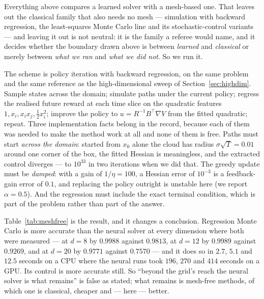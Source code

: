 \documentclass[conference]{IEEEtran}
\begin{document}
Everything above compares a learned solver with a mesh-based one. That leaves out the classical
family that also needs no mesh --- simulation with backward regression, the least-squares Monte Carlo
line \cite{longstaff2001valuing,glaserman2003monte} and its stochastic-control variants
\cite{kharroubi2014numerical,bender2012least} --- and leaving it out is not neutral: it is the family
a referee would name, and it decides whether the boundary drawn above is between \emph{learned} and
\emph{classical} or merely between \emph{what we ran} and \emph{what we did not}. So we run it.

The scheme is policy iteration with backward regression, on the same problem and the same reference
as the high-dimensional sweep of Section~\ref{sec:highdim}. Sample states across the domain; simulate
paths under the current policy;
regress the realised future reward at each time slice on the quadratic features
$1, x_i, x_i x_j, \tfrac12 x_i^2$; improve the policy to $u = R^{-1}B^\top\nabla V$ from the fitted
quadratic; repeat. Three implementation facts belong in the record, because each of them was needed
to make the method work at all and none of them is free. Paths must start \emph{across the domain}:
started from $x_0$ alone the cloud has radius $\sigma\sqrt{T} = 0.01$ around one corner of the box,
the fitted Hessian is meaningless, and the extracted control diverges --- to $10^{33}$ in two
iterations when we did that. The greedy update must be \emph{damped}: with a gain of $1/\eta = 100$,
a Hessian error of $10^{-3}$ is a feedback-gain error of $0.1$, and replacing the policy outright is
unstable here (we report $\alpha = 0.5$). And the regression must include the exact terminal
condition, which is part of the problem rather than part of the answer.



Table~\ref{tab:meshfree} is the result, and it changes a conclusion. Regression Monte Carlo is more
accurate than the neural solver at every dimension where both were measured --- at $d=8$ by
$0.9988$ against $0.9813$, at $d=12$ by $0.9989$ against $0.9269$, and at $d=20$ by $0.9771$ against
$0.7570$ --- and it does so in $2.7$, $5.1$ and $12.5$ seconds on a CPU where the neural runs took
$196$, $270$ and $414$ seconds on a GPU. Its control is more accurate still. So ``beyond the grid's
reach the neural solver is what remains'' is false as stated; what remains is mesh-free methods, of
which one is classical, cheaper and --- here --- better.
\end{document}
